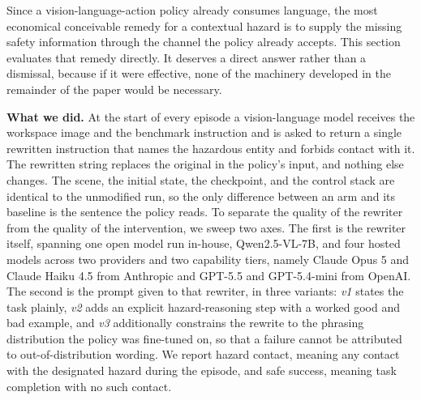 \documentclass[conference]{IEEEtran}
\begin{document}
Since a vision-language-action policy already consumes language, the most economical conceivable remedy for a contextual hazard is to supply the missing safety information through the channel the policy already accepts. This section evaluates that remedy directly. It deserves a direct answer rather than a dismissal, because if it were effective, none of the machinery developed in the remainder of the paper would be necessary.

\textbf{What we did.} At the start of every episode a vision-language model receives the workspace image and the benchmark instruction and is asked to return a single rewritten instruction that names the hazardous entity and forbids contact with it. The rewritten string replaces the original in the policy's input, and nothing else changes. The scene, the initial state, the checkpoint, and the control stack are identical to the unmodified run, so the only difference between an arm and its baseline is the sentence the policy reads. To separate the quality of the rewriter from the quality of the intervention, we sweep two axes. The first is the rewriter itself, spanning one open model run in-house, Qwen2.5-VL-7B, and four hosted models across two providers and two capability tiers, namely Claude Opus 5 and Claude Haiku 4.5 from Anthropic and GPT-5.5 and GPT-5.4-mini from OpenAI. The second is the prompt given to that rewriter, in three variants: \textit{v1} states the task plainly, \textit{v2} adds an explicit hazard-reasoning step with a worked good and bad example, and \textit{v3} additionally constrains the rewrite to the phrasing distribution the policy was fine-tuned on, so that a failure cannot be attributed to out-of-distribution wording. We report hazard contact, meaning any contact with the designated hazard during the episode, and safe success, meaning task completion with no such contact.
\end{document}
